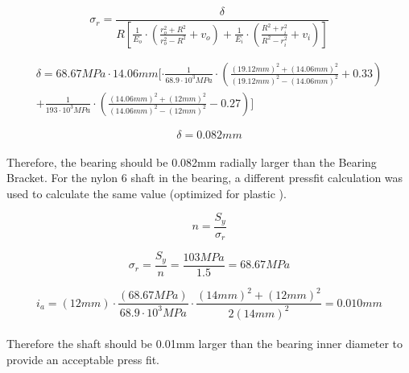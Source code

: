 \documentclass[../main.tex]{subfiles}
\begin{document}
\begin{equation}
\sigma_r=\frac{\delta}{R[\frac{1}{E_o}\cdot{}(\frac{r_o^2+R^2}{r_o^2-R^2}+v_o)+\frac{1}{E_i}\cdot{}(\frac{R^2+r_i^2}{R^2-r_i^2}+v_i)]}
\end{equation}	 
	
\begin{multline}
\delta = {68.67MPa}\cdot{}14.06mm[\cdot{}\frac{1}{68.9\cdot{10^3MPa}}\cdot{(\frac{(19.12mm)^2+(14.06mm)^2}{(19.12mm)^2-(14.06mm)^2}+0.33)}  
	\\ +\frac{1}{193\cdot{10^3MPa}}\cdot{(\frac{(14.06mm)^2+(12mm)^2}{(14.06mm)^2-(12mm)^2}-0.27)}]
\end{multline}

\begin{equation}
	\delta=0.082mm
\end{equation}
\\
Therefore, the bearing should be 0.082mm radially larger than the Bearing Bracket.
For the nylon 6 shaft in the bearing, a different pressfit calculation was used to calculate the same value (optimized for plastic \cite{pressfit}).

\begin{equation}
	n=\frac{S_y}{\sigma_r}
\end{equation}

\begin{equation}
{\sigma_r}=\frac{S_y}{n}=\frac{103MPa}{1.5}=68.67MPa
\end{equation}

\begin{equation}
i_a=(12mm)\cdot{}\frac{(68.67MPa)}{68.9\cdot{}10^3MPa}\cdot{}
\frac{(14mm)^2+(12mm)^2}{2(14mm)^2}=0.010mm
\end{equation}
\\
Therefore the shaft should be 0.01mm larger than the bearing inner diameter to provide an acceptable press fit.
\end{document}
